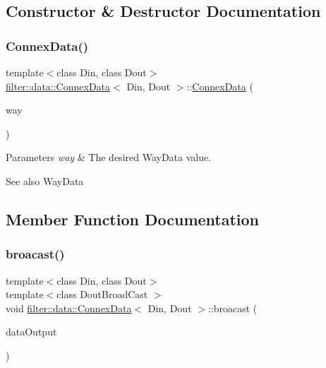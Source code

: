 \subsection{Constructor \& Destructor Documentation}
\mbox{\label{classfilter_1_1data_1_1_connex_data_a294f855ae8f4b203c8413a32f7e0c692}} 
\subsubsection{\texorpdfstring{Connex\+Data()}{ConnexData()}}
{\footnotesize\ttfamily template$<$class Din, class Dout$>$ \\
\hyperlink{classfilter_1_1data_1_1_connex_data}{filter\+::data\+::\+Connex\+Data}$<$ Din, Dout $>$\+::\hyperlink{classfilter_1_1data_1_1_connex_data}{Connex\+Data} (\begin{DoxyParamCaption}\item[{Way\+Data}]{way }\end{DoxyParamCaption})\hspace{0.3cm}{\ttfamily [inline]}}


\begin{DoxyParams}{Parameters}
{\em way} & The desired Way\+Data value. \\
\hline
\end{DoxyParams}
\begin{DoxySeeAlso}{See also}
Way\+Data 
\end{DoxySeeAlso}


\subsection{Member Function Documentation}
\mbox{\label{classfilter_1_1data_1_1_connex_data_abd05d79fd08000ff3c92e6fcc8cd41be}} 
\subsubsection{\texorpdfstring{broacast()}{broacast()}\hspace{0.1cm}{\footnotesize\ttfamily [1/2]}}
{\footnotesize\ttfamily template$<$class Din, class Dout$>$ \\
template$<$class Dout\+Broad\+Cast $>$ \\
void \hyperlink{classfilter_1_1data_1_1_connex_data}{filter\+::data\+::\+Connex\+Data}$<$ Din, Dout $>$\+::broacast (\begin{DoxyParamCaption}\item[{Dout\+Broad\+Cast}]{data\+Output }\end{DoxyParamCaption})\hspace{0.3cm}{\ttfamily [inline]}}


